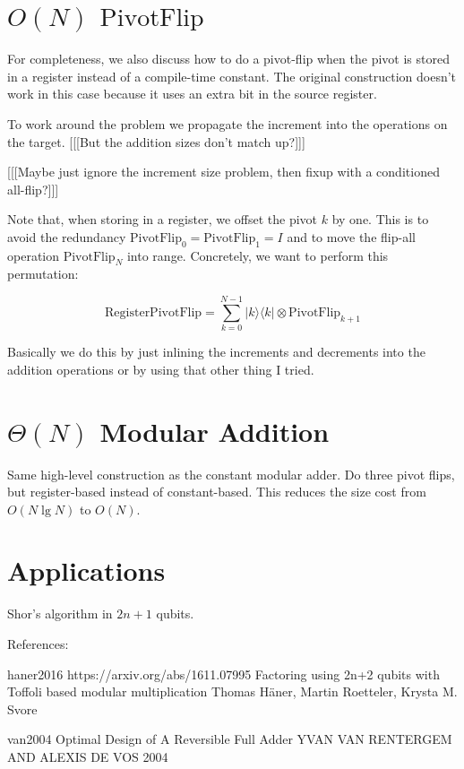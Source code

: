 \documentclass[twocolumn]{article}
\begin{document}
\section{$O(N)$ $\text{PivotFlip}$}

For completeness, we also discuss how to do a pivot-flip when the pivot is stored in a register instead of a compile-time constant.
The original construction doesn't work in this case because it uses an extra bit in the source register.

To work around the problem we propagate the increment into the operations on the target.
[[[But the addition sizes don't match up?]]]

[[[Maybe just ignore the increment size problem, then fixup with a conditioned all-flip?]]]

Note that, when storing in a register, we offset the pivot $k$ by one.
This is to avoid the redundancy $\text{PivotFlip}_0 = \text{PivotFlip}_1 = I$ and to move the flip-all operation $\text{PivotFlip}_{N}$ into range.
Concretely, we want to perform this permutation:

$$\text{RegisterPivotFlip} = \sum_{k=0}^{N-1} |k\rangle \langle k| \otimes \text{PivotFlip}_{k+1}$$

Basically we do this by just inlining the increments and decrements into the addition operations or by using that other thing I tried.

\section{$\Theta(N)$ Modular Addition}

Same high-level construction as the constant modular adder.
Do three pivot flips, but register-based instead of constant-based.
This reduces the size cost from $O(N \lg N)$ to $O(N)$.

\section{Applications}

Shor's algorithm in $2n+1$ qubits.





References:

haner2016 https://arxiv.org/abs/1611.07995
Factoring using 2n+2 qubits with Toffoli based modular multiplication
Thomas Häner, Martin Roetteler, Krysta M. Svore

van2004
Optimal Design of A Reversible Full Adder
YVAN VAN RENTERGEM AND ALEXIS DE VOS
2004
\end{document}
